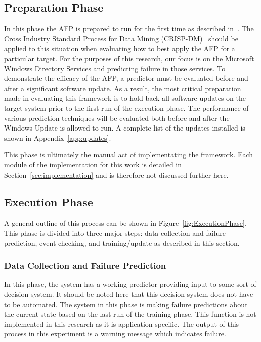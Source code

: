 \subsection{Preparation Phase}
In this phase the AFP is prepared to run for the first time as described
in~\cite{irrera2015}.  The Cross Industry Standard Process for Data Mining
(CRISP-DM)~\cite{crispdm} should be applied to this situation when evaluating
how to best apply the AFP for a particular target.  For the purposes of this
research, our focus is on the Microsoft Windows Directory Services and
predicting failure in those services.  To demonstrate the efficacy of the AFP,
a predictor must be evaluated before and after a significant software update.
As a result, the most critical preparation made in evaluating this framework is
to hold back all software updates on the target system prior to the first run
of the execution phase.  The performance of various prediction techniques will
be evaluated both before and after the Windows Update is allowed to run.  A
complete list of the updates installed is shown in Appendix~\ref{app:updates}.

This phase is ultimately the manual act of implementating the framework.  Each
module of the implementation for this work is detailed in
Section~\ref{sec:implementation} and is therefore not discussed further here.  

\subsection{Execution Phase}
A general outline of this process can be shown in
Figure~\ref{fig:ExecutionPhase}.  This phase is divided into three major
steps: data collection and failure prediction, event checking, and
training/update as described in this section.

\figExecutionPhase{2.5in}

\subsubsection{Data Collection and Failure Prediction}
In this phase, the system has a working predictor providing input to some sort
of decision system.  It should be noted here that this decision system does not
have to be automated.  The system in this phase is making failure predictions
about the current state based on the last run of the training phase.  This
function is not implemented in this research as it is application specific.
The output of this process in this experiment is a warning message which
indicates failure.

